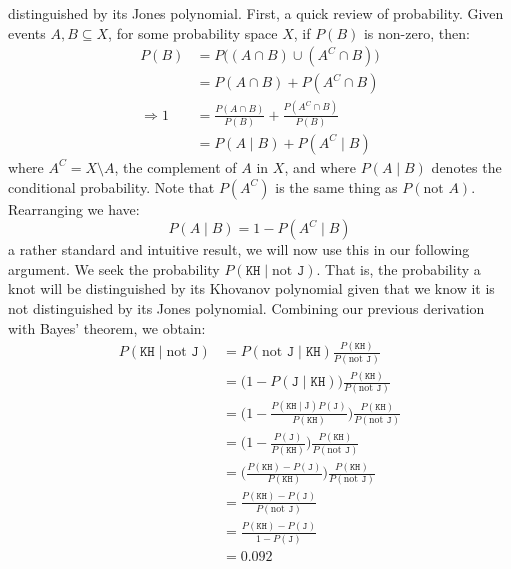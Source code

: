    distinguished by its Jones polynomial. First, a quick review of probability.
    Given events $A,B\subseteq{X}$, for some probability space $X$, if $P(B)$
    is non-zero, then:
    \begin{align}
        P(B)&=P\big((A\cap{B})\cup(A^{C}\cap{B})\big)\\
        &=P(A\cap{B})+P(A^{C}\cap{B})\\
        \Rightarrow
        1&=\frac{P(A\cap{B})}{P(B)}+\frac{P(A^{C}\cap{B})}{P(B)}\\
        &=P(A\;|\;B)+P(A^{C}\;|\;B)
    \end{align}
    where $A^{C}=X\setminus{A}$, the complement of $A$ in $X$, and
    where $P(A\;|\;B)$ denotes the conditional probability. Note that
    $P(A^{C})$ is the same thing as $P(\textrm{not }A)$.
    Rearranging we have:
    \begin{equation}
        P(A\;|\;B)=1-P(A^{C}\;|\;B)
    \end{equation}
    a rather standard and intuitive result, we will now use this in our
    following argument. We seek the probability
    $P(\texttt{KH}\;|\;\textrm{not }\texttt{J})$.
    That is, the probability a knot will
    be distinguished by its Khovanov polynomial given that we know it is
    not distinguished by its Jones polynomial. Combining our previous derivation
    with Bayes' theorem, we obtain:
    \begin{align}
        P(\texttt{KH}\;|\;\textrm{not }\texttt{J})
        &=P(\textrm{not }\texttt{J}\;|\;\texttt{KH})
        \frac{P(\texttt{KH})}{P(\textrm{not }\texttt{J})}\\
        &=\big(1-P(\texttt{J}\;|\;\texttt{KH})\big)
            \frac{P(\texttt{KH})}{P(\textrm{not }\texttt{J})}\\
        &=\big(
            1-\frac{P(\texttt{KH}\;|\;\textrm{J})P(\texttt{J})}{P(\texttt{KH})}
        \big)
        \frac{P(\texttt{KH})}{P(\textrm{not }\texttt{J})}\\
        &=\big(
            1-\frac{P(\texttt{J})}{P(\texttt{KH})}
        \big)
        \frac{P(\texttt{KH})}{P(\textrm{not }\texttt{J})}\\
        &=\big(
            \frac{P(\texttt{KH})-P(\texttt{J})}{P(\texttt{KH})}
        \big)
        \frac{P(\texttt{KH})}{P(\textrm{not }\texttt{J})}\\
        &=\frac{P(\texttt{KH})-P(\texttt{J})}{P(\textrm{not }\texttt{J})}\\
        &=\frac{P(\texttt{KH})-P(\texttt{J})}{1-P(\texttt{J})}\\
        &=0.092
    \end{align}
